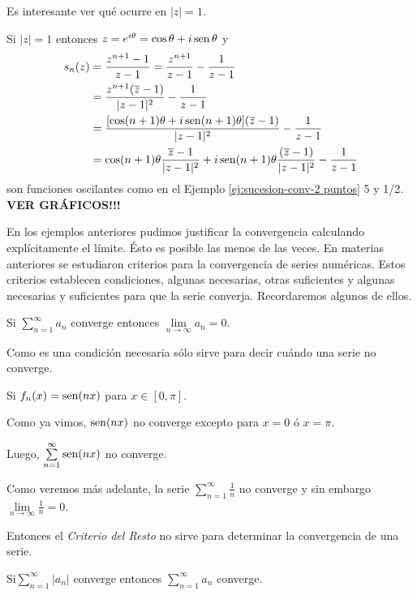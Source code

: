 Es interesante ver qué ocurre en $|z|=1$. 

Si $|z|=1$ entonces $z=e^{i\theta}=\cos \theta +i \operatorname{sen} \theta$ y 
\[
\begin{split}
s_n(z)&=
\frac{z^{n+1}-1}{z-1}=
\frac{z^{n+1}}{z-1}-\frac{1}{z-1}
\\
&=\frac{z^{n+1}(\overline z-1)}{|z-1|^2}-\frac{1}{z-1}
\\
&=\frac{ [\cos(n+1)\theta+i\operatorname{sen}(n+1)\theta](\overline z-1)}{|z-1|^2}-\frac{1}{z-1}
\\
&=\cos(n+1)\theta \frac{\overline z-1}{|z-1|^2}+i \operatorname{sen}(n+1)\theta \frac{(\overline z-1)}{|z-1|^2}-\frac{1}{z-1}
\end{split}
\]
son funciones oscilantes como en el Ejemplo \ref{ej:sucesion-conv-2 puntos} 5 y 1/2. \textbf{VER GRÁFICOS!!!}

En los ejemplos anteriores pudimos justificar la convergencia calculando explícitamente el límite. 
Ésto es posible las menos de las veces. En materias anteriores se estudiaron criterios para la 
convergencia de series  numéricas. Estos criterios establecen condiciones, algunas necesarias, otras 
suficientes y algunas necesarias y suficientes para que la serie converja. Recordaremos algunos de ellos.

\begin{teorema}{}
Si  $\sum\limits_{n=1}^{\infty} a_n$ converge entonces $\lim\limits_{n \to \infty} a_n=0$.
\end{teorema}

Como es una condición  necesaria sólo sirve para decir cuándo una serie no converge.

\begin{ejemplo}{}
Si $f_n(x)= \operatorname{sen}(nx)$ para $x \in [0,\pi]$. 

Como ya vimos, $\operatorname{sen}(nx)$ no converge excepto para $x=0$ \'o $x=\pi$. 

Luego, $\sum\limits_{n=1}^{\infty} \operatorname{sen}(nx)$ no converge.
\end{ejemplo}

Como veremos más adelante, la serie $\sum\limits_{n=1}^{\infty}\frac{1}{n}$ no converge y sin embargo
$\lim\limits_{n \to \infty}\frac{1}{n}=0$. 

Entonces el \textit{Criterio del Resto} no sirve para determinar
la convergencia de una serie.

\begin{teorema}{}
Si$\sum\limits_{n=1}^{\infty} |a_n|$ converge entonces $\sum\limits_{n=1}^{\infty} a_n$ converge.
\end{teorema}

